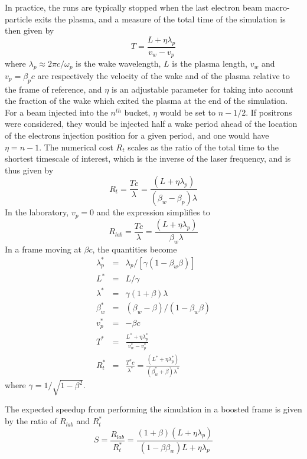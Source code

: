 \documentclass[]{report}
\begin{document}
In practice, the runs are typically stopped when the last electron beam macro-particle exits the plasma, and a measure of the total time of the simulation is then given by
%
\begin{equation}
T=\frac{L+\eta \lambda_p}{v_w-v_p}
\end{equation}
%
where $\lambda_p\approx 2\pi c/\omega_p$ is the wake wavelength, $L$ is the plasma length, $v_w$ and $v_p=\beta_p c$ are respectively the velocity of the wake and of the plasma relative to the frame of reference, and $\eta$ is an adjustable parameter for taking into account the fraction of the wake which exited the plasma at the end of the simulation.
For a beam injected into the $n^{th}$ bucket, $\eta$ would be set to $n-1/2$. If positrons were considered, they would be injected half a wake period ahead of the location of the electrons injection position for a given period, and one would have $\eta=n-1$. The numerical cost $R_t$ scales as the ratio of the total time to the shortest timescale of interest, which is the inverse of the laser frequency, and is thus given by
%
\begin{equation}
R_t=\frac{T c}{\lambda}=\frac{\left(L+\eta \lambda_p\right)}{\left(\beta_w-\beta_p\right) \lambda}
\end{equation}
%
In the laboratory, $v_p=0$ and the expression simplifies to 
%
\begin{equation}
R_{lab}=\frac{T c}{\lambda}=\frac{\left(L+\eta \lambda_p\right)}{\beta_w \lambda}
\end{equation}
%
In a frame moving at $\beta c$, the quantities become
\begin{eqnarray}
\lambda_p^*&=&\lambda_p/\left[\gamma \left(1-\beta_w \beta\right)\right] \\
L^*&=&L/\gamma \\
\lambda^*&=& \gamma\left(1+\beta\right) \lambda\\
\beta_w^*&=&\left(\beta_w-\beta\right)/\left(1-\beta_w\beta\right) \\
v_p^*&=&-\beta c \\
T^*&=&\frac{L^*+\eta \lambda_p^*}{v_w^*-v_p^*} \\
R_t^*&=&\frac{T^* c}{\lambda^*} = \frac{\left(L^*+\eta \lambda_p^*\right)}{\left(\beta_w^*+\beta\right) \lambda^*}
\end{eqnarray}
where $\gamma=1/\sqrt{1-\beta^2}$.

The expected speedup from performing the simulation in a boosted frame is given by the ratio of $R_{lab}$ and $R_t^*$
%
\begin{equation}
S=\frac{R_{lab}}{R_t^*}=\frac{\left(1+\beta\right)\left(L+\eta \lambda_p\right)}{\left(1-\beta\beta_w\right)L+\eta \lambda_p}
\label{Eq_scaling1d0}
\end{equation}
\end{document}
